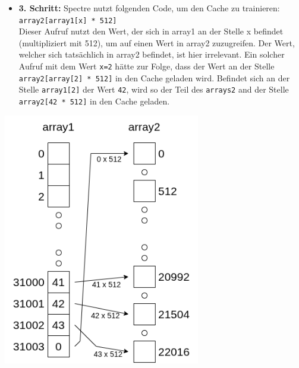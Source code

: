 \noindent
\begin{minipage}{0.58\textwidth}
	\begin{itemize}
		\item \textbf{3. Schritt:} Spectre nutzt folgenden Code, um den Cache zu trainieren: \\
		      \label{itm:spectre_step3_code}
		      \texttt{array2[array1[x] * 512]} \\
		      Dieser Aufruf nutzt den Wert, der sich in array1 an der Stelle x befindet (multipliziert mit 512), um auf einen Wert in array2 zuzugreifen.
		      Der Wert, welcher sich tatsächlich in array2 befindet, ist hier irrelevant.
		      Ein solcher Aufruf mit dem Wert \texttt{x=2} hätte zur Folge, dass der Wert an der Stelle \texttt{array2[array[2] * 512]} in den Cache geladen wird.
		      Befindet sich an der Stelle \texttt{array1[2]} der Wert \texttt{42}, wird so der Teil des \texttt{arrays2} and der Stelle \texttt{array2[42 * 512]} in den Cache geladen.
	\end{itemize}
\end{minipage}
\hfill
\begin{minipage}{0.4\textwidth}
	\centering
	\includegraphics[width=\linewidth]{Attack-2}
\end{minipage}


